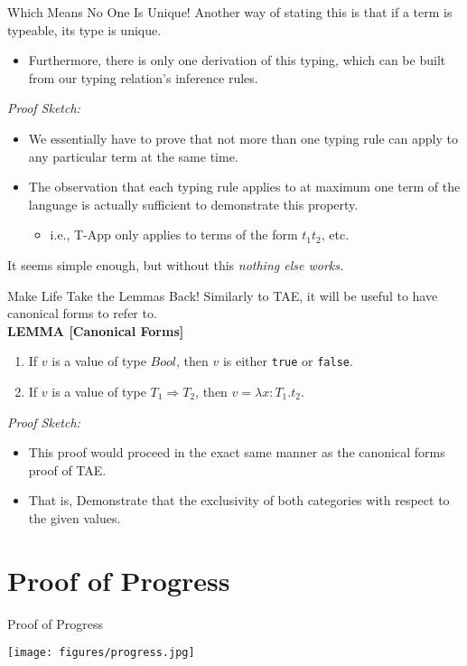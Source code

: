 \documentclass[11pt]{beamer}
\begin{document}
\begin{frame}[fragile=singleslide]{Which Means No One Is Unique!}
Another way of stating this is that if a term is typeable, its type is unique.  
\begin{itemize}
\item Furthermore, there is only one derivation of this typing, which can be built from our typing relation's inference rules.  
\end{itemize}
\emph{Proof Sketch:}
\begin{itemize}
\item We essentially have to prove that not more than one typing rule can apply to any particular term at the same time.  
\item The observation that each typing rule applies to at maximum one term of the language is actually sufficient to demonstrate this property.  
\begin{itemize}
\item i.e., T-App only applies to terms of the form $t_1 t_2$, etc.  
\end{itemize}
\end{itemize}
It seems simple enough, but without this \emph{nothing else works.}
\end{frame}

\begin{frame}[fragile=singleslide]{Make Life Take the Lemmas Back!}
Similarly to TAE, it will be useful to have canonical forms to refer to. \\

\textbf{LEMMA [Canonical Forms]}

\begin{enumerate}
\item If $v$ is a value of type $Bool$, then $v$ is either \texttt{true} or \texttt{false}.
\item If $v$ is a value of type $T_1 \Rightarrow T_2$, then $v = \lambda x : T_1. t_2$.
\end{enumerate}

\emph{Proof Sketch:}
\begin{itemize}
\item This proof would proceed in the exact same manner as the canonical forms proof of TAE. 
\item That is, Demonstrate that the exclusivity of both categories with respect to the given values.
\end{itemize}
\end{frame}


\section[Progress]{Proof of Progress}
\begin{frame}[fragile=singleslide]{Proof of Progress}
\begin{center}
\texttt{[image: figures/progress.jpg]}
\end{center}
\end{frame}
\end{document}
